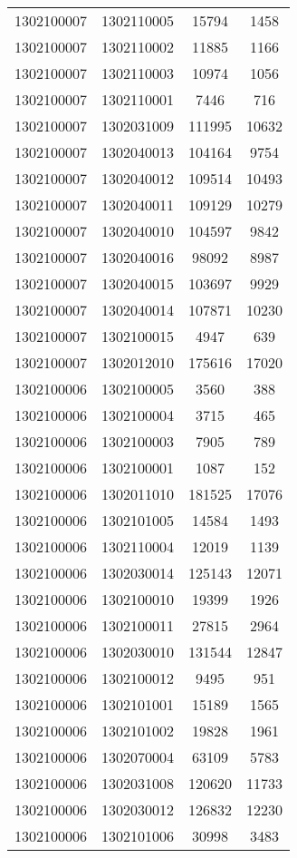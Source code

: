 \begin{longtable}{llcc}
1302100007 & 1302110005 & 15794 & 1458\\
1302100007 & 1302110002 & 11885 & 1166\\
1302100007 & 1302110003 & 10974 & 1056\\
1302100007 & 1302110001 & 7446 & 716\\
1302100007 & 1302031009 & 111995 & 10632\\
1302100007 & 1302040013 & 104164 & 9754\\
1302100007 & 1302040012 & 109514 & 10493\\
1302100007 & 1302040011 & 109129 & 10279\\
1302100007 & 1302040010 & 104597 & 9842\\
1302100007 & 1302040016 & 98092 & 8987\\
1302100007 & 1302040015 & 103697 & 9929\\
1302100007 & 1302040014 & 107871 & 10230\\
1302100007 & 1302100015 & 4947 & 639\\
1302100007 & 1302012010 & 175616 & 17020\\
1302100006 & 1302100005 & 3560 & 388\\
1302100006 & 1302100004 & 3715 & 465\\
1302100006 & 1302100003 & 7905 & 789\\
1302100006 & 1302100001 & 1087 & 152\\
1302100006 & 1302011010 & 181525 & 17076\\
1302100006 & 1302101005 & 14584 & 1493\\
1302100006 & 1302110004 & 12019 & 1139\\
1302100006 & 1302030014 & 125143 & 12071\\
1302100006 & 1302100010 & 19399 & 1926\\
1302100006 & 1302100011 & 27815 & 2964\\
1302100006 & 1302030010 & 131544 & 12847\\
1302100006 & 1302100012 & 9495 & 951\\
1302100006 & 1302101001 & 15189 & 1565\\
1302100006 & 1302101002 & 19828 & 1961\\
1302100006 & 1302070004 & 63109 & 5783\\
1302100006 & 1302031008 & 120620 & 11733\\
1302100006 & 1302030012 & 126832 & 12230\\
1302100006 & 1302101006 & 30998 & 3483\\

\end{longtable}
